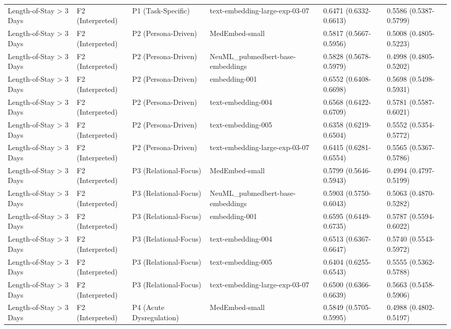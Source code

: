 \documentclass[border=0pt]{standalone}
\begin{document}
\begin{adjustbox}{width=\textwidth}
\begin{tabular}{llllll}
Length-of-Stay \textgreater{} 3 Days & F2 (Interpreted) & P1 (Task-Specific) & text-embedding-large-exp-03-07 & 0.6471 (0.6332-0.6613) & 0.5586 (0.5387-0.5799) \\
Length-of-Stay \textgreater{} 3 Days & F2 (Interpreted) & P2 (Persona-Driven) & MedEmbed-small & 0.5817 (0.5667-0.5956) & 0.5008 (0.4805-0.5223) \\
Length-of-Stay \textgreater{} 3 Days & F2 (Interpreted) & P2 (Persona-Driven) & NeuML\_pubmedbert-base-embeddings & 0.5828 (0.5678-0.5979) & 0.4998 (0.4805-0.5202) \\
Length-of-Stay \textgreater{} 3 Days & F2 (Interpreted) & P2 (Persona-Driven) & embedding-001 & 0.6552 (0.6408-0.6698) & 0.5698 (0.5498-0.5931) \\
Length-of-Stay \textgreater{} 3 Days & F2 (Interpreted) & P2 (Persona-Driven) & text-embedding-004 & 0.6568 (0.6422-0.6709) & 0.5781 (0.5587-0.6021) \\
Length-of-Stay \textgreater{} 3 Days & F2 (Interpreted) & P2 (Persona-Driven) & text-embedding-005 & 0.6358 (0.6219-0.6504) & 0.5552 (0.5354-0.5772) \\
Length-of-Stay \textgreater{} 3 Days & F2 (Interpreted) & P2 (Persona-Driven) & text-embedding-large-exp-03-07 & 0.6415 (0.6281-0.6554) & 0.5565 (0.5367-0.5786) \\
Length-of-Stay \textgreater{} 3 Days & F2 (Interpreted) & P3 (Relational-Focus) & MedEmbed-small & 0.5799 (0.5646-0.5943) & 0.4994 (0.4797-0.5199) \\
Length-of-Stay \textgreater{} 3 Days & F2 (Interpreted) & P3 (Relational-Focus) & NeuML\_pubmedbert-base-embeddings & 0.5903 (0.5750-0.6043) & 0.5063 (0.4870-0.5282) \\
Length-of-Stay \textgreater{} 3 Days & F2 (Interpreted) & P3 (Relational-Focus) & embedding-001 & 0.6595 (0.6449-0.6735) & 0.5787 (0.5594-0.6022) \\
Length-of-Stay \textgreater{} 3 Days & F2 (Interpreted) & P3 (Relational-Focus) & text-embedding-004 & 0.6513 (0.6367-0.6647) & 0.5740 (0.5543-0.5972) \\
Length-of-Stay \textgreater{} 3 Days & F2 (Interpreted) & P3 (Relational-Focus) & text-embedding-005 & 0.6404 (0.6255-0.6543) & 0.5555 (0.5362-0.5788) \\
Length-of-Stay \textgreater{} 3 Days & F2 (Interpreted) & P3 (Relational-Focus) & text-embedding-large-exp-03-07 & 0.6500 (0.6366-0.6639) & 0.5663 (0.5458-0.5906) \\
Length-of-Stay \textgreater{} 3 Days & F2 (Interpreted) & P4 (Acute Dysregulation) & MedEmbed-small & 0.5849 (0.5705-0.5995) & 0.4988 (0.4802-0.5197) \\

\end{tabular}
\end{adjustbox}
\end{document}
